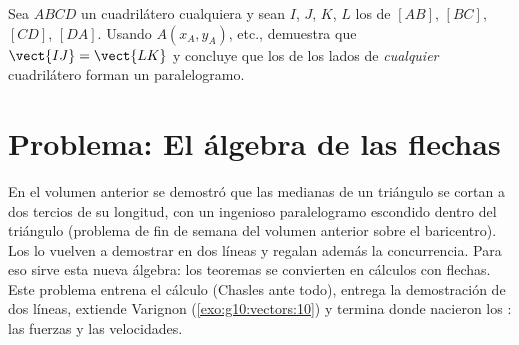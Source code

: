 \begin{exercise}[$\star\star\star$]\label{exo:g10:vectors:10}
Sea $ABCD$ un cuadrilátero cualquiera y sean $I$, $J$, $K$, $L$ los
 de $[AB]$, $[BC]$, $[CD]$, $[DA]$. Usando 
$A(x_A, y_A)$, etc., demuestra que $\vect{IJ} = \vect{LK}$ y concluye que
los  de los lados de \emph{cualquier} cuadrilátero forman un
paralelogramo.
\end{exercise}

\section{Problema: El álgebra de las flechas}

\begin{problem}
\label{pb:g10:vectors:1}
En el volumen anterior se demostró que las medianas de un triángulo se
cortan a dos tercios de su longitud, con un ingenioso paralelogramo
escondido dentro del triángulo (problema de fin de semana del volumen
anterior sobre el baricentro). Los  lo vuelven a demostrar en dos
líneas y regalan además la concurrencia. Para eso sirve esta nueva
álgebra: los teoremas se convierten en cálculos con flechas. Este problema
entrena el cálculo (Chasles ante todo), entrega la demostración de dos
líneas, extiende Varignon (\cref{exo:g10:vectors:10}) y termina donde
nacieron los : las fuerzas y las velocidades.


\end{problem}
